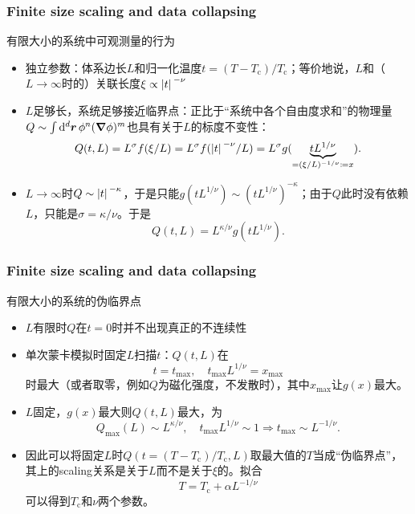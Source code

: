 \documentclass[UTF8]{ctexbeamer}
\begin{document}
\begin{frame}
\frametitle{Finite size scaling and data collapsing}

有限大小的系统中可观测量的行为

\begin{itemize}
    \item 独立参数：体系边长$L$和归一化温度$t = (T - T_\text{c}) / T_\text{c}$；等价地说，$L$和（$L \to \infty$时的）关联长度$\xi \propto \abs*{t}^{- \nu}$
    \item $L$足够长，系统足够接近临界点：正比于“系统中各个自由度求和”的物理量$Q \sim \int \dd[d]{\vb*{r}} \phi^n (\grad{\phi})^m$也具有关于$L$的标度不变性：
    \[
        Q(t, L) = L^\sigma f(\xi / L) = L^{\sigma} f(\abs*{t}^{- \nu} / L) = L^\sigma g(\underbrace{t L^{1 / \nu}}_{= (\xi / L)^{- 1 / \nu} \coloneqq x}).
    \]
    \item $L \to \infty$时$Q \sim \abs*{t}^{- \kappa}$，于是只能$g(t L^{1 / \nu}) \sim (t L^{1 / \nu})^{- \kappa}$；由于$Q$此时没有依赖$L$，只能是$\sigma = \kappa / \nu$。于是
    \begin{equation}
        Q(t, L) = L^{\kappa / \nu} g(t L^{1 / \nu}).
    \end{equation}
\end{itemize}    

\end{frame}

\begin{frame}
\frametitle{Finite size scaling and data collapsing}

有限大小的系统的伪临界点

\begin{itemize}
    \item $L$有限时$Q$在$t=0$时并不出现真正的不连续性
    \item 单次蒙卡模拟时固定$L$扫描$t$：$Q(t, L)$在
    \begin{equation}
        t = t_\text{max}, \quad t_\text{max} L^{1 / \nu} = x_\text{max}
    \end{equation}
    时最大（或者取零，例如$Q$为磁化强度，不发散时），其中$x_\text{max}$让$g(x)$最大。
    \item $L$固定，$g(x)$最大则$Q(t, L)$最大，为
    \begin{equation}
        Q_\text{max}(L) \sim L^{\kappa / \nu}, \quad t_\text{max} L^{1 / \nu} \sim 1 \Rightarrow t_\text{max} \sim L^{- 1 / \nu}.
    \end{equation}
    \item 因此可以将固定$L$时$Q(t = (T - T_\text{c}) / T_\text{c}, L)$取最大值的$T$当成“伪临界点”，其上的scaling关系是关于$L$而不是关于$\xi$的。拟合
    \begin{equation}
        T = T_\text{c} + \alpha L^{- 1 / \nu}
    \end{equation}
    可以得到$T_\text{c}$和$\nu$两个参数。
\end{itemize}

\end{frame}
\end{document}
